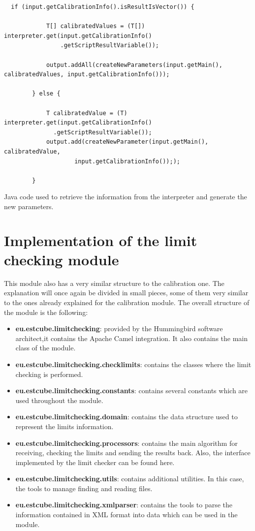 \begin{table}[h]
\lstset{language=Java}
\begin{lstlisting}
  if (input.getCalibrationInfo().isResultIsVector()) {

            T[] calibratedValues = (T[]) interpreter.get(input.getCalibrationInfo()
                .getScriptResultVariable());

            output.addAll(createNewParameters(input.getMain(), calibratedValues, input.getCalibrationInfo()));

        } else {

            T calibratedValue = (T) interpreter.get(input.getCalibrationInfo()
              .getScriptResultVariable());
            output.add(createNewParameter(input.getMain(), calibratedValue,
                    input.getCalibrationInfo()););

        }
\end{lstlisting}
\caption{Java code used to retrieve the information from the interpreter and generate the new parameters.}
\label{Table5.4}
\end{table}


\section{Implementation of the limit checking module}

This module also has a very similar structure to the calibration one. The explanation will once again be divided in small pieces, some of them very similar to the ones already explained for the calibration module. The overall structure of the module is the following:

\begin{itemize}
\item \textbf{eu.estcube.limitchecking}: provided by the Hummingbird software architect,it contains the Apache Camel integration. It also contains the main class of the module.
\item \textbf{eu.estcube.limitchecking.checklimits}: contains the classes where the limit checking is performed.
\item \textbf{eu.estcube.limitchecking.constants}: contains several constants which are used throughout the module.
\item \textbf{eu.estcube.limitchecking.domain}: contains the data structure used to represent the limits information.
\item \textbf{eu.estcube.limitchecking.processors}: contains the main algorithm for receiving, checking the limits and sending the results back. Also, the interface implemented by the limit checker can be found here.
\item \textbf{eu.estcube.limitchecking.utils}: contains additional utilities. In this case, the tools to manage finding and reading files.
\item \textbf{eu.estcube.limitchecking.xmlparser}: contains the tools to parse the information contained in XML format into data which can be used in the module.
\end{itemize}

